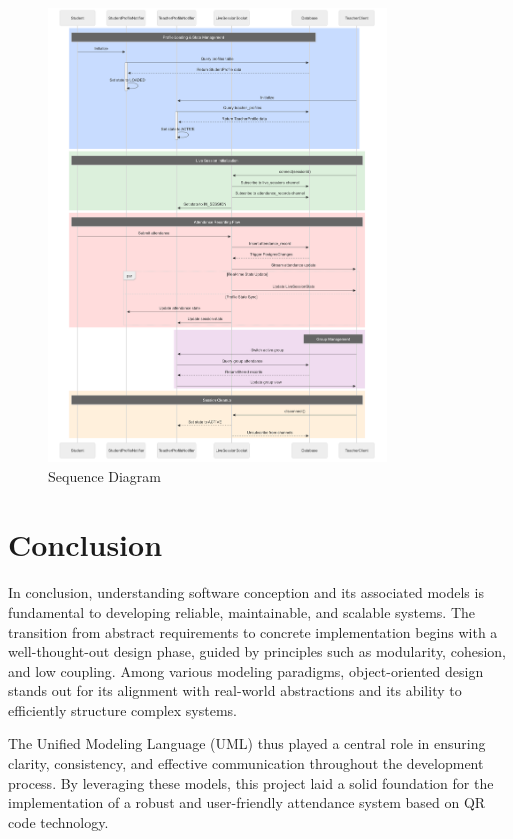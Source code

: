 \documentclass[12pt,a4paper]{report}
\begin{document}
\begin{figure}[htbp]
    \centering
    \includegraphics[width=0.8\textwidth]{images/morsli/sequence.png}
    \caption{Sequence Diagram}
    \label{fig:attendance-system}
\end{figure}
\clearpage
\section{Conclusion}

In conclusion, understanding software conception and its associated models is fundamental to developing reliable, maintainable, and scalable systems. The transition from abstract requirements to concrete implementation begins with a well-thought-out design phase, guided by principles such as modularity, cohesion, and low coupling. Among various modeling paradigms, object-oriented design stands out for its alignment with real-world abstractions and its ability to efficiently structure complex systems.

The Unified Modeling Language (UML) thus played a central role in ensuring clarity, consistency, and effective communication throughout the development process. By leveraging these models, this project laid a solid foundation for the implementation of a robust and user-friendly attendance system based on QR code technology.
\end{document}
